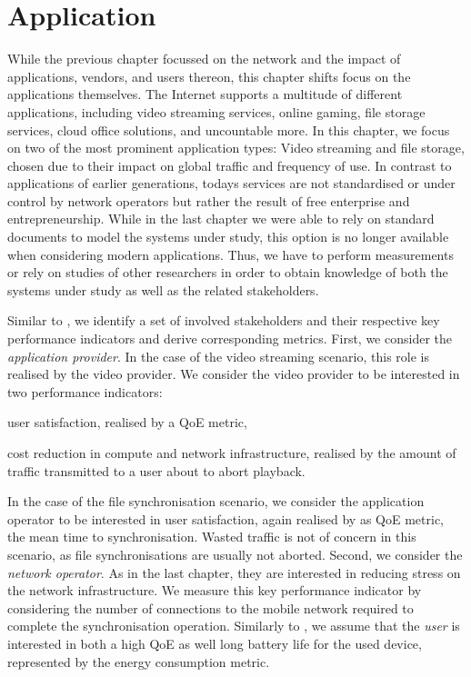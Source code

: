 \chapter{Application}\label{chap:application}

\newcommand{\download}{Download\xspace}
\newcommand{\live}{Live\xspace}
\newcommand{\serviceprovisioning}{Provisioning\xspace}
\newcommand{\streaming}{Streaming\xspace}

While the previous chapter focussed on the network and the impact of applications, vendors, and users thereon, this chapter shifts focus on the applications themselves.
The Internet supports a multitude of different applications, including video streaming services, online gaming, file storage services, cloud office solutions, and uncountable more.
In this chapter, we focus on two of the most prominent application types: Video streaming and file storage, chosen due to their impact on global traffic and frequency of use.
In contrast to applications of earlier generations, todays services are not standardised or under control by network operators but rather the result of free enterprise and entrepreneurship.
While in the last chapter we were able to rely on standard documents to model the systems under study, this option is no longer available when considering modern applications.
Thus, we have to perform measurements or rely on studies of other researchers in order to obtain knowledge of both the systems under study as well as the related stakeholders.

Similar to , we identify a set of involved stakeholders and their respective key performance indicators and derive corresponding metrics.
First, we consider the \emph{application provider}. 
In the case of the video streaming scenario, this role is realised by the video provider.
We consider the video provider to be interested in two performance indicators: 
\begin{enumerate*}
\item user satisfaction, realised by a \gls{QoE} metric,
\item cost reduction in compute and network infrastructure, realised by the amount of traffic transmitted to a user about to abort playback.
\end{enumerate*}
In the case of the file synchronisation scenario, we consider the application operator to be interested in user satisfaction, again realised by as \gls{QoE} metric, the mean time to synchronisation.
Wasted traffic is not of concern in this scenario, as file synchronisations are usually not aborted.
Second, we consider the \emph{network operator}.
As in the last chapter, they are interested in reducing stress on the network infrastructure.
We measure this key performance indicator by considering the number of connections to the mobile network required to complete the synchronisation operation.
Similarly to , we assume that the \emph{user} is interested in both a high \gls{QoE} as well long battery life for the used device, represented by the energy consumption metric. 

